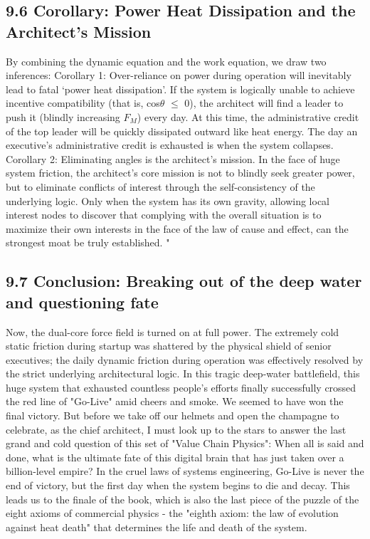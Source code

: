 \documentclass[11pt,a4paper]{article}
\begin{document}
\subsection*{9.6 Corollary: Power Heat Dissipation and the Architect’s Mission}


By combining the dynamic equation and the work equation, we draw two inferences: Corollary 1: Over-reliance on power during operation will inevitably lead to fatal ‘power heat dissipation’. If the system is logically unable to achieve incentive compatibility (that is, cos$\theta$ $\le$ 0), the architect will find a leader to push it (blindly increasing $F_M$) every day. At this time, the administrative credit of the top leader will be quickly dissipated outward like heat energy. The day an executive's administrative credit is exhausted is when the system collapses. Corollary 2: Eliminating angles is the architect’s mission. In the face of huge system friction, the architect's core mission is not to blindly seek greater power, but to eliminate conflicts of interest through the self-consistency of the underlying logic. Only when the system has its own gravity, allowing local interest nodes to discover that complying with the overall situation is to maximize their own interests in the face of the law of cause and effect, can the strongest moat be truly established. "


\subsection*{9.7 Conclusion: Breaking out of the deep water and questioning fate}


Now, the dual-core force field is turned on at full power. The extremely cold static friction during startup was shattered by the physical shield of senior executives; the daily dynamic friction during operation was effectively resolved by the strict underlying architectural logic. In this tragic deep-water battlefield, this huge system that exhausted countless people's efforts finally successfully crossed the red line of "Go-Live" amid cheers and smoke. We seemed to have won the final victory. But before we take off our helmets and open the champagne to celebrate, as the chief architect, I must look up to the stars to answer the last grand and cold question of this set of "Value Chain Physics": When all is said and done, what is the ultimate fate of this digital brain that has just taken over a billion-level empire? In the cruel laws of systems engineering, Go-Live is never the end of victory, but the first day when the system begins to die and decay. This leads us to the finale of the book, which is also the last piece of the puzzle of the eight axioms of commercial physics - the "eighth axiom: the law of evolution against heat death" that determines the life and death of the system.
\end{document}

